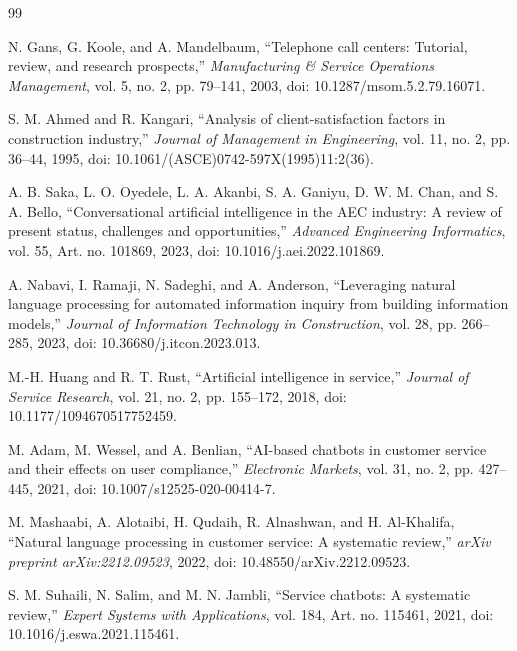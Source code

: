 \documentclass[11pt,a4paper]{article}
\begin{document}
\begingroup
\renewcommand{\section}[2]{}
\begin{thebibliography}{99}

N. Gans, G. Koole, and A. Mandelbaum,
``Telephone call centers: Tutorial, review, and research prospects,''
\textit{Manufacturing \& Service Operations Management}, vol. 5, no. 2,
pp. 79--141, 2003, doi: 10.1287/msom.5.2.79.16071.

S. M. Ahmed and R. Kangari,
``Analysis of client-satisfaction factors in construction industry,''
\textit{Journal of Management in Engineering}, vol. 11, no. 2,
pp. 36--44, 1995, doi: 10.1061/(ASCE)0742-597X(1995)11:2(36).

A. B. Saka, L. O. Oyedele, L. A. Akanbi, S. A. Ganiyu, D. W. M. Chan,
and S. A. Bello,
``Conversational artificial intelligence in the AEC industry: A review of
present status, challenges and opportunities,''
\textit{Advanced Engineering Informatics}, vol. 55, Art. no. 101869, 2023,
doi: 10.1016/j.aei.2022.101869.

A. Nabavi, I. Ramaji, N. Sadeghi, and A. Anderson,
``Leveraging natural language processing for automated information inquiry
from building information models,''
\textit{Journal of Information Technology in Construction}, vol. 28,
pp. 266--285, 2023, doi: 10.36680/j.itcon.2023.013.

M.-H. Huang and R. T. Rust,
``Artificial intelligence in service,''
\textit{Journal of Service Research}, vol. 21, no. 2, pp. 155--172, 2018,
doi: 10.1177/1094670517752459.

M. Adam, M. Wessel, and A. Benlian,
``AI-based chatbots in customer service and their effects on user
compliance,'' \textit{Electronic Markets}, vol. 31, no. 2, pp. 427--445,
2021, doi: 10.1007/s12525-020-00414-7.

M. Mashaabi, A. Alotaibi, H. Qudaih, R. Alnashwan, and H. Al-Khalifa,
``Natural language processing in customer service: A systematic review,''
\textit{arXiv preprint arXiv:2212.09523}, 2022,
doi: 10.48550/arXiv.2212.09523.

S. M. Suhaili, N. Salim, and M. N. Jambli,
``Service chatbots: A systematic review,''
\textit{Expert Systems with Applications}, vol. 184, Art. no. 115461, 2021,
doi: 10.1016/j.eswa.2021.115461.


\end{thebibliography}
\end{document}
